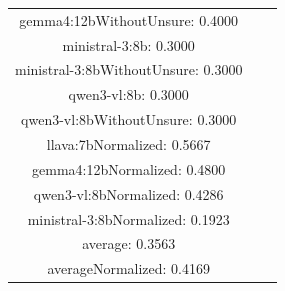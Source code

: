 \documentclass[a4paper]{article}
\begin{document}
\begin{tabular}{ccc}
gemma4:12bWithoutUnsure: 0.4000 \\ ministral-3:8b: 0.3000 \\ ministral-3:8bWithoutUnsure: 0.3000 \\ qwen3-vl:8b: 0.3000 \\ qwen3-vl:8bWithoutUnsure: 0.3000 \\ llava:7bNormalized: 0.5667 \\ gemma4:12bNormalized: 0.4800 \\ qwen3-vl:8bNormalized: 0.4286 \\ ministral-3:8bNormalized: 0.1923 \\ average: 0.3563 \\ averageNormalized: 0.4169 \end{minipage}\\
\end{tabular}

\vspace{5mm}
\end{document}
